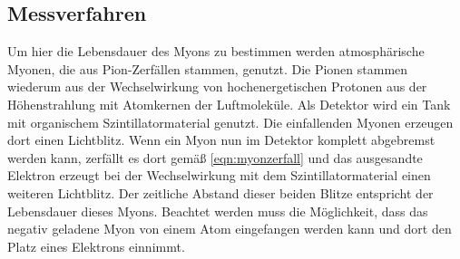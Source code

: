 \subsection{Messverfahren}
Um hier die Lebensdauer des Myons zu bestimmen werden atmosphärische Myonen, die aus Pion-Zerfällen stammen, genutzt. Die Pionen stammen wiederum aus der Wechselwirkung von hochenergetischen Protonen aus der Höhenstrahlung mit Atomkernen der Luftmoleküle. Als Detektor wird ein Tank mit organischem Szintillatormaterial genutzt. Die einfallenden Myonen erzeugen dort einen Lichtblitz. Wenn ein Myon nun im Detektor komplett abgebremst werden kann, zerfällt es dort gemäß \eqref{eqn:myonzerfall} und das ausgesandte Elektron erzeugt bei der Wechselwirkung mit dem Szintillatormaterial einen weiteren Lichtblitz. Der zeitliche Abstand dieser beiden Blitze entspricht der Lebensdauer dieses Myons. Beachtet werden muss die Möglichkeit, dass das negativ geladene Myon von einem Atom eingefangen werden kann und dort den Platz eines Elektrons einnimmt.
